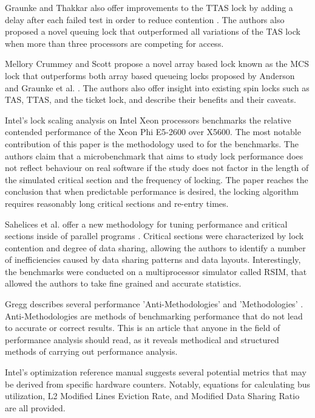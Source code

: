 \documentclass[a4paper, 12pt, titlepage]{article}
\begin{document}
\begin{onehalfspacing}
Graunke and Thakkar also offer improvements to the TTAS lock by adding a delay after each failed test in order to reduce contention \cite{graunke1990synchronization}. The authors also proposed a novel queuing lock that outperformed all variations of the TAS lock when more than three processors are competing for access.

Mellory Crummey and Scott propose a novel array based lock known as the MCS lock that outperforms both array based queueing locks proposed by Anderson and Graunke et al. \cite{mellor1991algorithms}. The authors also offer insight into existing spin locks such as TAS, TTAS, and the ticket lock, and describe their benefits and their caveats.

Intel's lock scaling analysis on Intel Xeon processors \cite{intelxeonlockscaling} benchmarks the relative contended performance of the Xeon Phi E5-2600 over X5600. The most notable contribution of this paper is the methodology used to for the benchmarks. The authors claim that a microbenchmark that aims to study lock performance does not reflect behaviour on real software if the study does not factor in the length of the simulated critical section and the frequency of locking. The paper reaches the conclusion that when predictable performance is desired, the locking algorithm requires reasonably long critical sections and re-entry times.

Sahelices et al. offer a new methodology for tuning performance and critical sections inside of parallel programs \cite{sahelices2009methodology}. Critical sections were characterized by lock contention and degree of data sharing, allowing the authors to identify a number of inefficiencies caused by data sharing patterns and data layouts. Interestingly, the benchmarks were conducted on a multiprocessor simulator called RSIM, that allowed the authors to take fine grained and accurate statistics.

Gregg describes several performance 'Anti-Methodologies' and 'Methodologies' \cite{methodologygregg}. Anti-Methodologies are methods of benchmarking performance that do not lead to accurate or correct results. This is an article that anyone in the field of performance analysis should read, as it reveals methodical and structured methods of carrying out performance analysis.

Intel's optimization reference manual \cite{intelmanualoptimization} suggests several potential metrics that may be derived from specific hardware counters. Notably, equations for calculating bus utilization, L2 Modified Lines Eviction Rate, and Modified Data Sharing Ratio are all provided.



\end{onehalfspacing}
\end{document}
